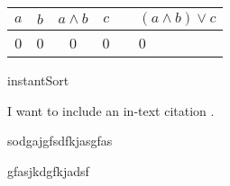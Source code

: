 \documentclass[11pt]{article}
\begin{document}
\begin{tabular}{ccccp{1em}l}
    \toprule
    $a$&    $b$&    $a \land b$&    $c$&&   $(a \land b) \lor c$\\
    \midrule
    0&      0&      0&              0&&     0\\
    \bottomrule
\end{tabular}


\begin{algorithm}
    \caption{instantSort}
    \begin{algorithmic}[3]
            \State {}
        \Else
            \State {}
        \EndIf
    \end{algorithmic}
\end{algorithm}
%
%
%

I want to include an in-text citation \cite{somesciencepeople1977}.

sodgajgfsdfkjasgfas

gfasjkdgfkjadsf

\nocite{*} %


\end{document}
